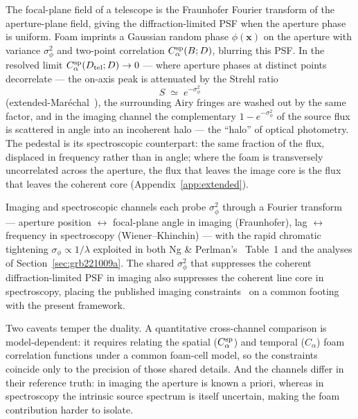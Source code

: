 \documentclass[aps,prd,onecolumn,amsmath,amssymb]{revtex4-2}
\begin{document}
The focal-plane field of a telescope is the Fraunhofer Fourier
transform of the aperture-plane field, giving the diffraction-limited
PSF when the aperture phase is uniform.  Foam imprints a Gaussian
random phase $\phi(\mathbf{x})$ on the aperture with variance
$\sigma_\phi^2$ and two-point correlation $C_\alpha^{\rm sp}(B;D)$,
blurring this PSF.  In the resolved limit
$C_\alpha^{\rm sp}(D_{\rm tel};D)\to 0$ --- where aperture phases at
distinct points decorrelate --- the on-axis peak is attenuated by the
Strehl ratio
\begin{equation}
  S \;\simeq\; e^{-\sigma_\phi^2}
  \label{eq:strehl}
\end{equation}
(extended-Mar\'echal~\cite{NgPerlman2022}), the surrounding Airy
fringes are washed out by the same factor, and in the imaging
channel the complementary $1-e^{-\sigma_\phi^2}$ of the source flux is
scattered in angle into an incoherent halo --- the ``halo'' of optical
photometry.
The pedestal is its spectroscopic counterpart: the same fraction of
the flux, displaced in frequency rather than in angle; where the foam is
transversely uncorrelated across the aperture, the flux that leaves the image
core is the flux that leaves the coherent core
(Appendix~\ref{app:extended}).

Imaging and spectroscopic channels each probe $\sigma_\phi^2$ through
a Fourier transform --- aperture position $\leftrightarrow$ focal-plane
angle in imaging (Fraunhofer), lag $\leftrightarrow$ frequency in
spectroscopy (Wiener--Khinchin) --- with the rapid chromatic tightening
$\sigma_\phi\propto 1/\lambda$ exploited in both Ng \&
Perlman's~\cite{NgPerlman2022} Table~1 and the analyses of
Section~\ref{sec:grb221009a}.  The shared $\sigma_\phi^2$ that
suppresses the coherent diffraction-limited PSF in imaging also
suppresses the coherent line core in spectroscopy, placing the
published imaging
constraints~\cite{NgPerlman2022,LieuHillman2003,Christiansen2011,Perlman2015}
on a common footing with the present framework.

Two caveats temper the duality.  A quantitative cross-channel comparison
is model-dependent: it requires relating the spatial ($C_\alpha^{\rm sp}$)
and temporal ($C_\alpha$) foam correlation functions under a common
foam-cell model, so the constraints coincide only to the precision of
those shared details.  And the channels differ in their reference truth:
in imaging the aperture is known a priori, whereas in spectroscopy the
intrinsic source spectrum is itself uncertain, making the foam
contribution harder to isolate.
\end{document}
